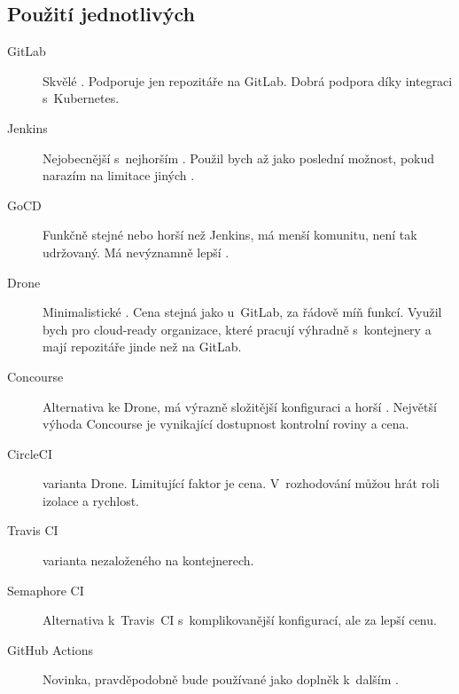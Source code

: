     \subsection{Použití jednotlivých \CI}
        \begin{description}
            \item[GitLab] Skvělé \CI. Podporuje jen repozitáře na GitLab. Dobrá podpora \CD díky integraci s~Kubernetes.
            \item[Jenkins] Nejobecnější \CI s~nejhorším . Použil bych až jako poslední možnost, pokud narazím na limitace jiných \CI.
            \item[GoCD] Funkčně stejné nebo horší než Jenkins, má menší komunitu, není tak udržovaný. Má nevýznamně lepší .
            \item[Drone] Minimalistické \CI. Cena stejná jako u~GitLab, za řádově míň funkcí. Využil bych pro cloud-ready organizace, které pracují výhradně s~kontejnery a mají repozitáře jinde než na GitLab.
            \item[Concourse] Alternativa ke Drone, má výrazně složitější konfiguraci a horší . Největší výhoda Concourse je vynikající dostupnost kontrolní roviny a cena.
            \item[CircleCI]  varianta Drone. Limitující faktor je cena. V~rozhodování můžou hrát roli izolace a rychlost.
            \item[Travis CI]  varianta \CI nezaloženého na kontejnerech.
            \item[Semaphore CI] Alternativa k~Travis~CI s~komplikovanější konfigurací, ale za lepší cenu.
            \item[GitHub Actions] Novinka, pravděpodobně bude používané jako doplněk k~dalším \CI.
        \end{description}
